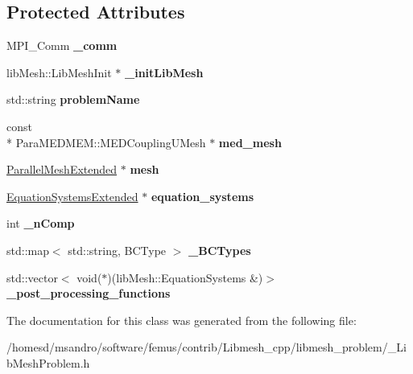 \subsection*{Protected Attributes}
\begin{DoxyCompactItemize}
\item 
\hypertarget{class___lib_mesh_problem_ab45902984281a4a6460443ae5ea80737}{M\-P\-I\-\_\-\-Comm {\bfseries \-\_\-comm}}\label{class___lib_mesh_problem_ab45902984281a4a6460443ae5ea80737}

\item 
\hypertarget{class___lib_mesh_problem_a4a12c20724ed9561bdaabdd1205548a1}{lib\-Mesh\-::\-Lib\-Mesh\-Init $\ast$ {\bfseries \-\_\-init\-Lib\-Mesh}}\label{class___lib_mesh_problem_a4a12c20724ed9561bdaabdd1205548a1}

\item 
\hypertarget{class___lib_mesh_problem_a6ea27959c2c72628bef4195991451948}{std\-::string {\bfseries problem\-Name}}\label{class___lib_mesh_problem_a6ea27959c2c72628bef4195991451948}

\item 
\hypertarget{class___lib_mesh_problem_ac48b158e95da1ecd9825ceb1200c566f}{const \\*
Para\-M\-E\-D\-M\-E\-M\-::\-M\-E\-D\-Coupling\-U\-Mesh $\ast$ {\bfseries med\-\_\-mesh}}\label{class___lib_mesh_problem_ac48b158e95da1ecd9825ceb1200c566f}

\item 
\hypertarget{class___lib_mesh_problem_ac094f4bbfb23d0a923fca0bbc6819a7c}{\hyperlink{class_parallel_mesh_extended}{Parallel\-Mesh\-Extended} $\ast$ {\bfseries mesh}}\label{class___lib_mesh_problem_ac094f4bbfb23d0a923fca0bbc6819a7c}

\item 
\hypertarget{class___lib_mesh_problem_a6ef56bdc17332a06789f3e7ea14bd8f6}{\hyperlink{class_equation_systems_extended}{Equation\-Systems\-Extended} $\ast$ {\bfseries equation\-\_\-systems}}\label{class___lib_mesh_problem_a6ef56bdc17332a06789f3e7ea14bd8f6}

\item 
\hypertarget{class___lib_mesh_problem_a40f55d4d5645515916e3825d742db0ca}{int {\bfseries \-\_\-n\-Comp}}\label{class___lib_mesh_problem_a40f55d4d5645515916e3825d742db0ca}

\item 
\hypertarget{class___lib_mesh_problem_a00366edec65284af72f89efbe1de02af}{std\-::map$<$ std\-::string, B\-C\-Type $>$ {\bfseries \-\_\-\-B\-C\-Types}}\label{class___lib_mesh_problem_a00366edec65284af72f89efbe1de02af}

\item 
\hypertarget{class___lib_mesh_problem_a652d4a40f5990654d7ad6cf92977a52c}{std\-::vector$<$ void($\ast$)(lib\-Mesh\-::\-Equation\-Systems \&)$>$ {\bfseries \-\_\-post\-\_\-processing\-\_\-functions}}\label{class___lib_mesh_problem_a652d4a40f5990654d7ad6cf92977a52c}

\end{DoxyCompactItemize}


The documentation for this class was generated from the following file\-:\begin{DoxyCompactItemize}
\item 
/homesd/msandro/software/femus/contrib/\-Libmesh\-\_\-cpp/libmesh\-\_\-problem/\-\_\-\-Lib\-Mesh\-Problem.\-h\end{DoxyCompactItemize}
